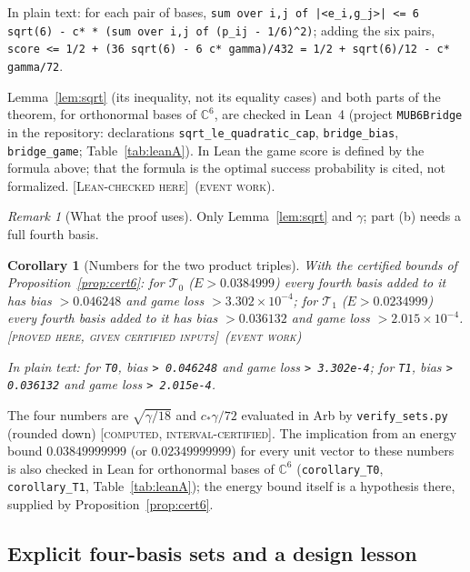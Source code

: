 \documentclass[11pt]{article}
\newcommand{\C}{\mathbb{C}}
\newcommand{\Tz}{\mathcal{T}_0}          %
\newcommand{\To}{\mathcal{T}_1}          %
\newcommand{\E}{E}                       %
\newcommand{\cstar}{c_\ast}              %
\newcommand{\st}[1]{\textsc{[#1]}}
\newcommand{\stleanA}{\st{Lean-checked here}}
\newcommand{\stgiven}{\st{proved here, given certified inputs}}
\newcommand{\stcert}{\st{computed, interval-certified}}
\newcommand{\event}{\textsc{(event work)}}
\newtheorem{corollary}[theorem]{Corollary}
\theoremstyle{definition}
\theoremstyle{remark}
\newtheorem{remark}[theorem]{Remark}
\begin{document}
{\raggedright \noindent In plain text: for each pair of bases, \texttt{sum over i,j of |<e\_i,g\_j>| <= 6 sqrt(6) -~c* * (sum over i,j of
(p\_ij -~1/6)\textasciicircum2)}; adding the six pairs, \texttt{score <= 1/2 + (36 sqrt(6) -~6 c* gamma)/432 = 1/2 + sqrt(6)/12 -
c* gamma/72}.\par}

Lemma~\ref{lem:sqrt} (its inequality, not its equality cases) and both parts of the theorem, for orthonormal bases
of $\C^6$, are checked in Lean~4 (project \texttt{MUB6Bridge} in the repository: declarations
\texttt{sqrt\_le\_quadratic\_cap}, \texttt{bridge\_bias}, \texttt{bridge\_game}; Table~\ref{tab:leanA}). In Lean the
game score is defined by the formula above; that the formula is the optimal success probability is cited, not
formalized. \stleanA\ \event.

\begin{remark}[What the proof uses]\label{rem:bridgeuses}
Only Lemma~\ref{lem:sqrt} and $\gamma$; part (b) needs a full fourth basis.
\end{remark}

\begin{corollary}[Numbers for the two product triples]\label{cor:numbers}
With the certified bounds of Proposition~\ref{prop:cert6}:
for $\Tz$ ($\E>0.0384999$) every fourth basis added to it has bias $>0.046248$ and game loss $>3.302\times10^{-4}$;
for $\To$ ($\E>0.0234999$) every fourth basis added to it has bias $>0.036132$ and game loss $>2.015\times10^{-4}$.
\stgiven\ \event

In plain text: for \texttt{T0}, bias \texttt{> 0.046248} and game loss \texttt{> 3.302e-4}; for \texttt{T1}, bias
\texttt{> 0.036132} and game loss \texttt{> 2.015e-4}.
\end{corollary}

The four numbers are $\sqrt{\gamma/18}$ and $\cstar\gamma/72$ evaluated in Arb by \texttt{verify\_sets.py} (rounded down) \stcert. The implication from an energy bound $0.03849999999$ (or $0.02349999999$) for every unit vector to these numbers
is also checked in Lean for orthonormal bases of $\C^6$ (\texttt{corollary\_T0}, \texttt{corollary\_T1},
Table~\ref{tab:leanA}); the energy bound itself is a hypothesis there, supplied by Proposition~\ref{prop:cert6}.

\subsection{Explicit four-basis sets and a design lesson}\label{sec:sets}
\end{document}

